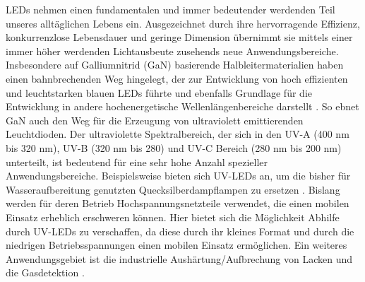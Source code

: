 LEDs nehmen einen fundamentalen und immer bedeutender werdenden Teil unseres alltäglichen Lebens ein. Ausgezeichnet durch ihre hervorragende Effizienz, konkurrenzlose Lebensdauer und geringe Dimension übernimmt sie mittels einer immer höher werdenden Lichtausbeute zusehends neue Anwendungsbereiche.
\newline
Insbesondere auf Galliumnitrid (GaN) basierende Halbleitermaterialien haben einen bahnbrechenden Weg hingelegt, der zur Entwicklung von hoch effizienten und leuchtstarken blauen LEDs führte und ebenfalls Grundlage für die Entwicklung in andere hochenergetische Wellenlängenbereiche darstellt \cite{risk} \cite{Shuji1999CandelaclassHI} \cite{10007979421}. So ebnet GaN auch den Weg für die Erzeugung von ultraviolett emittierenden Leuchtdioden. Der ultraviolette Spektralbereich, der sich in den UV-A (400 nm bis 320 nm), UV-B (320 nm bis 280) und UV-C Bereich (280 nm bis 200 nm) unterteilt, ist bedeutend für eine sehr hohe Anzahl spezieller Anwendungsbereiche. 
\newline
Beispielsweise bieten sich UV-LEDs an, um die bisher für Wasseraufbereitung genutzten Quecksilberdampflampen zu ersetzen \cite{Vilhunen2009} \cite{WURTELE20111481}. Bislang werden für deren Betrieb Hochspannungsnetzteile verwendet, die einen mobilen Einsatz erheblich erschweren können. Hier bietet sich die Möglichkeit Abhilfe durch UV-LEDs zu verschaffen, da diese durch ihr kleines Format und durch die niedrigen Betriebsspannungen einen mobilen Einsatz ermöglichen. Ein weiteres Anwendungsgebiet ist die industrielle Aushärtung/Aufbrechung von Lacken und die Gasdetektion \cite{0268-1242-26-1-014036}\cite{LALINSKY2010152}. 
\iffalse
